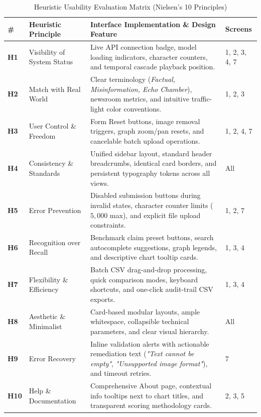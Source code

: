 \documentclass[11pt, a4paper]{article}
\begin{document}
\begin{table}[H]
  \centering
  \small
  \caption{Heuristic Usability Evaluation Matrix (Nielsen's 10 Principles)}
  \label{tab:nielsen-heuristics}
  \begin{tabularx}{\textwidth}{@{}C{0.8cm} L{3.5cm} Y C{1.6cm}@{}}
    \toprule
    \textbf{\#} & \textbf{Heuristic Principle} & \textbf{Interface Implementation \& Design Feature} & \textbf{Screens} \\
    \midrule
    \textbf{H1} & Visibility of System Status &
    Live API connection badge, model loading indicators, character counters, and temporal cascade playback position. &
    1, 2, 3, 4, 7 \\
    \textbf{H2} & Match with Real World &
    Clear terminology (\emph{Factual, Misinformation, Echo Chamber}), newsroom metrics, and intuitive traffic-light color conventions. &
    1, 2, 3 \\
    \textbf{H3} & User Control \& Freedom &
    Form Reset buttons, image removal triggers, graph zoom/pan resets, and cancelable batch upload operations. &
    1, 2, 4, 7 \\
    \textbf{H4} & Consistency \& Standards &
    Unified sidebar layout, standard header breadcrumbs, identical card borders, and persistent typography tokens across all views. &
    All \\
    \textbf{H5} & Error Prevention &
    Disabled submission buttons during invalid states, character counter limits ($5,000$ max), and explicit file upload constraints. &
    1, 2, 7 \\
    \textbf{H6} & Recognition over Recall &
    Benchmark claim preset buttons, search autocomplete suggestions, graph legends, and descriptive chart tooltip cards. &
    1, 3, 4 \\
    \textbf{H7} & Flexibility \& Efficiency &
    Batch CSV drag-and-drop processing, quick comparison modes, keyboard shortcuts, and one-click audit-trail CSV exports. &
    1, 3, 4 \\
    \textbf{H8} & Aesthetic \& Minimalist &
    Card-based modular layouts, ample whitespace, collapsible technical parameters, and clear visual hierarchy. &
    All \\
    \textbf{H9} & Error Recovery &
    Inline validation alerts with actionable remediation text (\emph{"Text cannot be empty"}, \emph{"Unsupported image format"}), and timeout retries. &
    7 \\
    \textbf{H10} & Help \& Documentation &
    Comprehensive About page, contextual info tooltips next to chart titles, and transparent scoring methodology cards. &
    2, 3, 5 \\
    \bottomrule
  \end{tabularx}
\end{table}
\end{document}
